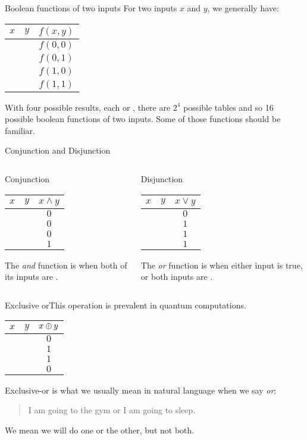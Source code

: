 \def\BTable#1#2#3#4#5{%
\begin{center}
\begin{tabular}{cc|c}
$x$ & $y$ & \ensuremath{#1} \\
\hline
\Zero{} & \Zero{} & \ensuremath{#2} \\
\Zero{} & \One{} & \ensuremath{#3} \\
\One{} & \Zero{} & \ensuremath{#4} \\
\One{} & \One{} & \ensuremath{#5} \\
\end{tabular}
\end{center}
}
\begin{frame}{Boolean functions of two inputs}
For two inputs $x$ and $y$, we generally have:
\BTable{f(x,y)}{f(0,0)}{f(0,1)}{f(1,0)}{f(1,1)}
With four possible results, each \Zero{} or \One{}, there are $2^4$ possible tables and so 16 possible boolean functions of two inputs.
\BigSkip{}
Some of those functions should be familiar.
\end{frame}

\begin{frame}{Conjunction and Disjunction}

\begin{columns}
\begin{column}{0.4\textwidth}
Conjunction

\BTable{x\wedge y}{0}{0}{0}{1}

The \emph{and} function is \True{} when both of its inputs are \True{}.

\end{column}
\begin{column}{0.4\textwidth}
Disjunction

\BTable{x\vee y}{0}{1}{1}{1}

The \emph{or} function is \True{} when either input is true, or both inputs are \True{}.

\end{column}
\end{columns}
\end{frame}

\begin{frame}{Exclusive or}{This operation is prevalent in quantum computations.}

\BTable{\Xor{x}{y}}{0}{1}{1}{0}

Exclusive-or is what we usually mean in natural language when we say \emph{or}:
\MedSkip{}
\begin{quote}
    I am going to the gym or I am going to sleep.
\end{quote}
We mean we will do one or the other, but not both.
\end{frame}

